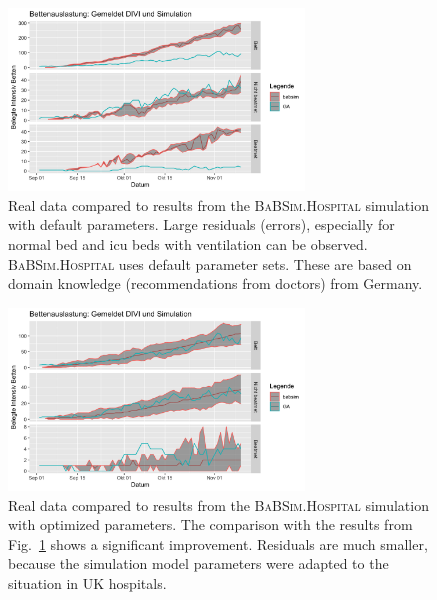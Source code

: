 \documentclass[conference]{IEEEtran}
\newcommand{\babsimhospital}{\textsc{BaBSim.Hospital}\xspace}
\begin{document}
\begin{figure}
  \centering
   \includegraphics[width=0.7\textwidth]{default.png}
  \caption{Real data compared to results from the \babsimhospital simulation with default parameters. Large residuals (errors), especially for normal bed and icu beds with ventilation can be observed.
   \babsimhospital uses default parameter sets. These are based on domain knowledge (recommendations from doctors) from Germany. }
\label{fig:default}
\end{figure}
\begin{figure}
    \centering
    \includegraphics[width=0.7\textwidth]{optimized.png}
    \caption{Real data compared to results from the \babsimhospital simulation with optimized parameters. The comparison with the results from Fig.~\ref{fig:default} shows a significant improvement. Residuals are much smaller,
    because the simulation model parameters were adapted to the situation in UK hospitals.
  }
\label{fig:optimized}
\end{figure}
\end{document}
